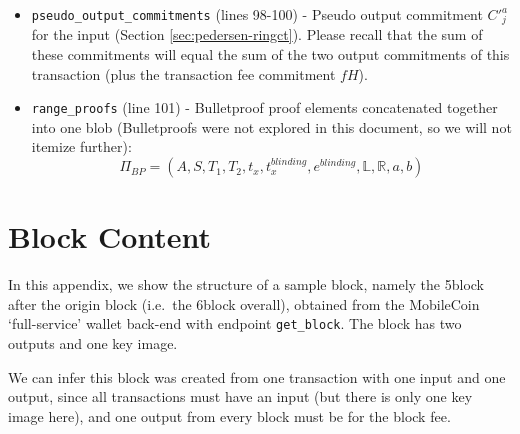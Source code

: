 \begin{appendices}
\begin{itemize}
    \item {\tt pseudo\_output\_commitments} (lines 98-100) - Pseudo output commitment $C'^a_j$ for the input (Section \ref{sec:pedersen-ringct}). Please recall that the sum of these commitments will equal the sum of the two output commitments of this transaction (plus the transaction fee commitment $f H$).
    \item {\tt range\_proofs} (line 101) - Bulletproof proof elements concatenated together into one blob (Bulletproofs were not explored in this document, so we will not itemize further):\vspace{.175cm}
    \[\Pi_{BP} = (A, S, T_1, T_2, t_x, t^{blinding}_x, e^{blinding}, \mathbb{L}, \mathbb{R}, a, b)\]
\end{itemize}




\chapter{Block Content}
\label{appendix:block-content}

In this appendix, we show the structure of a sample block, namely the 5\nth block after the origin block (i.e.\ the 6\nth block overall), obtained from the MobileCoin `full-service' wallet back-end \cite{mobilecoin-full-service-source-code} with endpoint {\tt get\_block}. The block has two outputs and one key image.

We can infer this block was created from one transaction with one input and one output, since all transactions must have an input (but there is only one key image here), and one output from every block must be for the block fee.


\end{appendices}
